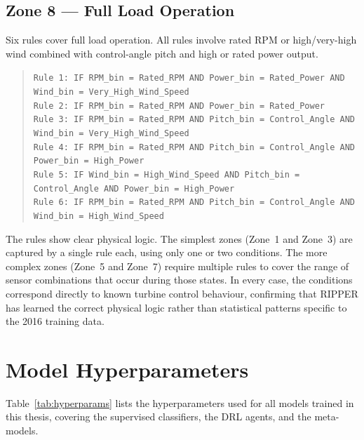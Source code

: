 {\section*{Zone 8 --- Full Load Operation}
Six rules cover full load operation. All rules involve rated RPM or high/very-high wind
combined with control-angle pitch and high or rated power output.
\begin{quote}
\texttt{Rule 1: IF RPM\_bin = Rated\_RPM AND Power\_bin = Rated\_Power AND Wind\_bin = Very\_High\_Wind\_Speed}\\
\texttt{Rule 2: IF RPM\_bin = Rated\_RPM AND Power\_bin = Rated\_Power}\\
\texttt{Rule 3: IF RPM\_bin = Rated\_RPM AND Pitch\_bin = Control\_Angle AND Wind\_bin = Very\_High\_Wind\_Speed}\\
\texttt{Rule 4: IF RPM\_bin = Rated\_RPM AND Pitch\_bin = Control\_Angle AND Power\_bin = High\_Power}\\
\texttt{Rule 5: IF Wind\_bin = High\_Wind\_Speed AND Pitch\_bin = Control\_Angle AND Power\_bin = High\_Power}\\
\texttt{Rule 6: IF RPM\_bin = Rated\_RPM AND Pitch\_bin = Control\_Angle AND Wind\_bin = High\_Wind\_Speed}
\end{quote}

The rules show clear physical logic. The simplest zones (Zone~1 and Zone~3) are captured
by a single rule each, using only one or two conditions. The more complex zones (Zone~5
and Zone~7) require multiple rules to cover the range of sensor combinations that occur
during those states. In every case, the conditions correspond directly to known turbine
control behaviour, confirming that RIPPER has learned the correct physical logic rather
than statistical patterns specific to the 2016 training data.

}
\chapter{Model Hyperparameters}
\label{app:hyperparams}

Table~\ref{tab:hyperparams} lists the hyperparameters used for all models trained in
this thesis, covering the supervised classifiers, the DRL agents, and the meta-models.


